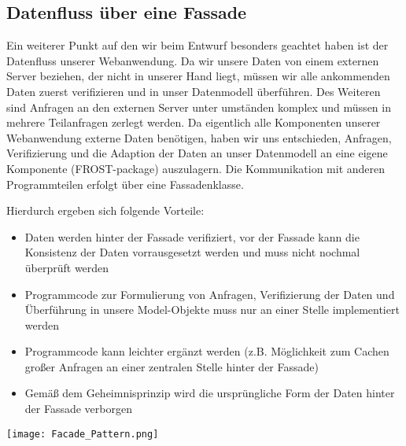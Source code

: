 \subsection{Datenfluss über eine Fassade}
Ein weiterer Punkt auf den wir beim Entwurf besonders geachtet haben ist der Datenfluss unserer Webanwendung. Da wir unsere Daten von einem externen Server beziehen, der nicht in unserer Hand liegt, müssen wir alle ankommenden Daten zuerst verifizieren und in unser Datenmodell überführen. Des Weiteren sind Anfragen an den externen Server unter umständen komplex und müssen in mehrere Teilanfragen zerlegt werden.
Da eigentlich alle Komponenten unserer Webanwendung externe Daten benötigen, haben wir uns entschieden, Anfragen, Verifizierung und die Adaption der Daten an unser Datenmodell an eine eigene Komponente (FROST-package) auszulagern. Die Kommunikation mit anderen Programmteilen erfolgt über eine Fassadenklasse.

Hierdurch ergeben sich folgende Vorteile:
\begin{itemize}
    \item Daten werden hinter der Fassade verifiziert, vor der Fassade kann die Konsistenz der Daten vorrausgesetzt werden und muss nicht nochmal überprüft werden
    \item Programmcode zur Formulierung von Anfragen, Verifizierung der Daten und Überführung in unsere Model-Objekte muss nur an einer Stelle implementiert werden
    \item Programmcode kann leichter ergänzt werden (z.B. Möglichkeit zum Cachen großer Anfragen an einer zentralen Stelle hinter der Fassade)
    \item Gemäß dem Geheimnisprinzip wird die ursprüngliche Form der Daten hinter der Fassade verborgen
\end{itemize}

\vspace{5mm}

\texttt{[image: Facade\_Pattern.png]}
